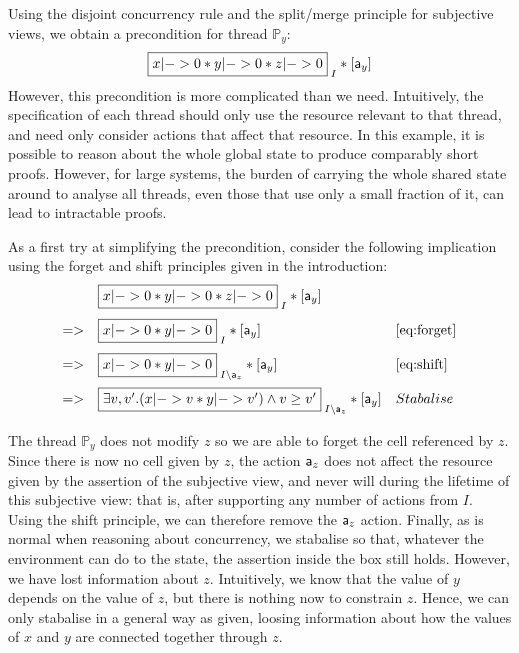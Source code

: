 Using the disjoint concurrency rule and the 
split/merge principle for subjective views, we obtain a  precondition for thread $\mathbb{P}_y$:
\[
\shared{x|-> 0 * y|->0 * z|-> 0}{I} *[\token a_y]
\]
However, this precondition  is more complicated than we
need. Intuitively, 
the specification of each thread should only use the resource 
relevant to that thread, and need only consider actions that
affect that resource.  In this example, it is possible to reason about
the  whole global state to  produce comparably short proofs.
However, for large systems, 
the burden of carrying the whole shared state around to analyse
all threads, even those that use only a small fraction of it, can lead
to intractable proofs. 

As a first try at simplifying the precondition, consider the following implication using the forget
and shift principles given in the introduction:
\[
\begin{array}{lll}
 & \shared{x|-> 0 * y|->0 * z|-> 0}{I} *[\token a_y]&\\[1em]
=> & \shared{x|-> 0 * y|->0}{I} *[\token a_y ]&\eqref{eq:forget}\\[1em]
 => & \shared{x|-> 0 * y|->0 }{I\backslash\token a_z} *[\token a_y]
 &\eqref{eq:shift}\\[1em]
=> & \shared{\exists v, v'.  (x|-> v * y|->v' ) \wedge v\geq v'}{I\backslash \token a_z} *[\token a_y]
 & Stabalise\\[1em]
\end{array}
\]
The thread $\mathbb{P}_y$ does not modify $z$ so we are able to  forget the
cell referenced by $z$. Since there is now no cell given by $z$, the
action $\mathsf{a}_z$ does not affect the resource given by the
assertion of the subjective view, and never will during the lifetime
of this subjective view: that is,  after supporting any number of actions
from $I$. Using the shift principle, we
can therefore  remove the $\mathsf{a}_z$ action. 
Finally, as is normal when reasoning about concurrency, we stabalise so
that, whatever the environment can do to the state, the assertion
inside the box still holds. However, we have   lost information about
$z$. Intuitively, we know that the value of $y$ depends on the value
of $z$, but there is nothing now to constrain $z$. Hence, we can only
stabalise in a general way as given, loosing information about how the
values of $x$ and $y$ are connected together through $z$.

